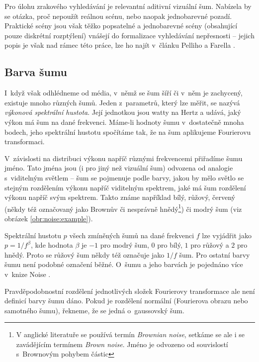 Pro úlohu zrakového vyhledávání je relevantní aditivní vizuální šum. Nabízela
by se otázka, proč nepoužít reálnou scénu, nebo naopak jednobarevné pozadí.
Praktické scény jsou však těžko popsatelné a jednobarevné scény (obsahující
pouze diskrétní rozptýlení) vnášejí do formalizace vyhledávání nepřesnosti --
jejich popis je však nad rámec této práce, lze ho najít v~článku
Pelliho a Farella \citeyearpar{WhyNoise}.

  

\subsection{Barva šumu}

I~když však
odhlédneme od média, v~němž se šum šíří či v~něm je zachycený, existuje mnoho
různých šumů. Jeden z~parametrů, který lze měřit, se nazývá {\it výkonová
spektrální hustota}. Její jednotkou jsou watty na Hertz a udává, jaký výkon má šum na dané frekvenci. Máme-li hodnoty šumu v~dostatečně mnoha bodech, jeho spektrální hustotu spočítáme tak, že na šum aplikujeme
Fourierovu transformaci.

V~závislosti na distribuci výkonu napříč různými frekvencemi přiřadíme šumu jméno. Tato jména jsou (i pro jiný než vizuální šum) odvozena od analogie s~viditelným světlem -- šum se pojmenuje podle barvy, jakou by mělo světlo se stejným rozdělením výkonu napříč viditelným spektrem, jaké má šum rozdělení výkonu napříč svým spektrem. Takto známe například bílý, růžový, červený (někdy též označovaný jako
Brownův či nesprávně hnědý\footnote{V anglické literatuře se používá
termín {\it Brownian noise}, setkáme se ale i se zavádějícím
termínem {\it Brown noise}. Jméno je odvozeno od souvislostí s~Brownovým pohybem částic}) či modrý šum (viz obrázek \ref{obr:noise:example}).

Spektrální hustotu $p$ všech zmíněných šumů na dané frekvenci $f$ lze vyjádřit jako
$p=1/f^\beta$, kde hodnota $\beta$ je $-1$ pro modrý šum, $0$ pro bílý, $1$ pro
růžový a $2$ pro hnědý. Proto se růžový šum někdy též označuje jako $1/f$ šum. Pro
ostatní barvy šumu není podobné označení běžné. O~šumu a jeho barvách je pojednáno více
v~knize Noise \citep{Noise}.

Pravděpodobnostní rozdělení jednotlivých složek Fourierovy transformace ale
není definicí barvy šumu dáno. Pokud je rozdělení normální (Fourierova obrazu
nebo samotného šumu), řekneme, že se jedná o~gaussovský šum.

